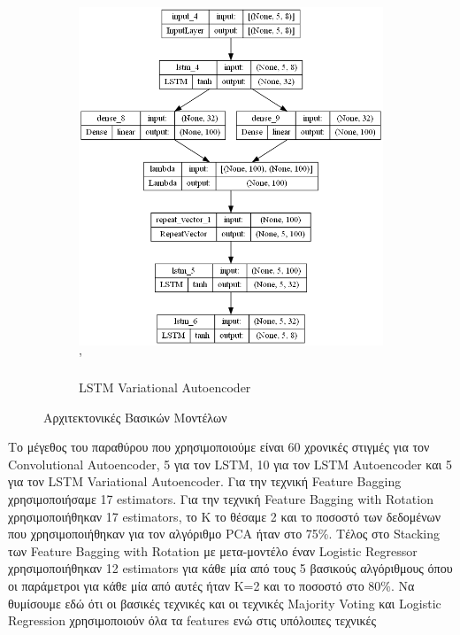 \documentclass[a4paper,12pt]{report}
\theoremstyle{definitionNODot}
\begin{document}
\begin{figure}[H]
\begin{subfigure}[b]{0.5\textwidth}
			\includegraphics[width=\textwidth]{plot_model_lstm_vae_model.png}'
			\caption{LSTM Variational Autoencoder}
			\label{fig:plot_model_lstm_vae_model}
		\end{subfigure}
		
		\caption{Αρχιτεκτονικές Βασικών Μοντέλων}
		\label{fig:plot_model_architecture_model}
	\end{figure}
	
	Το μέγεθος του παραθύρου που χρησιμοποιούμε είναι 60 χρονικές στιγμές για τον Convolutional Autoencoder, 5 για τον LSTM, 10 για τον LSTM Autoencoder και 5 για τον LSTM Variational Autoencoder. Για την τεχνική Feature Bagging χρησιμοποιήσαμε 17 estimators. Για την τεχνική Feature Bagging with Rotation χρησιμοποιήθηκαν 17 estimators, το Κ το θέσαμε 2 και το ποσοστό των δεδομένων που χρησιμοποιήθηκαν για τον αλγόριθμο PCA ήταν στο 75\%. Τέλος στο Stacking των Feature Bagging with Rotation με μετα-μοντέλο έναν Logistic Regressor χρησιμοποιήθηκαν 12 estimators για κάθε μία από τους 5 βασικούς αλγόριθμους όπου οι παράμετροι για κάθε μία από αυτές ήταν K=2 και το ποσοστό στο 80\%. Να θυμίσουμε εδώ ότι οι βασικές τεχνικές και οι τεχνικές Majority Voting και Logistic Regression χρησιμοποιούν όλα τα features ενώ στις υπόλοιπες τεχνικές 
	
\end{document}
